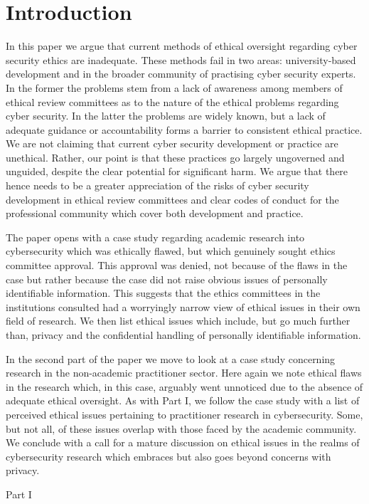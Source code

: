 \documentclass{svjour3}                     %
\begin{document}
\section{Introduction}
\label{intro}
In this paper we argue that current methods of ethical oversight regarding cyber security ethics are inadequate. These methods fail in two areas: university-based development and in the broader community of practising cyber security experts. In the former the problems stem from a lack of awareness among members of ethical review committees as to the nature of the ethical problems regarding cyber security. In the latter the problems are widely known, but a lack of adequate guidance or accountability forms a barrier to consistent ethical practice. We are not claiming that current cyber security development or practice are unethical. Rather, our point is that these practices go largely ungoverned and unguided, despite the clear potential for significant harm. We argue that there hence needs to be a greater appreciation of the risks of cyber security development in ethical review committees and clear codes of conduct for the professional community which cover both development and practice.

The paper opens with a case study regarding academic research into cybersecurity which was ethically flawed, but which genuinely sought ethics committee approval. This approval was denied, not because of the flaws in the case but rather because the case did not raise obvious issues of personally identifiable information. This suggests that the ethics committees in the institutions consulted had a worryingly narrow view of ethical issues in their own field of research. We then list ethical issues which include, but go much further than, privacy and the confidential handling of personally identifiable information.

In the second part of the paper we move to look at a case study concerning research in the non-academic practitioner sector. Here again we note ethical flaws in the research which, in this case, arguably went unnoticed due to the absence of adequate ethical oversight. As with Part I, we follow the case study with a list of perceived ethical issues pertaining to practitioner research in cybersecurity. Some, but not all, of these issues overlap with those faced by the academic community. We conclude with a call for a mature discussion on ethical issues in the realms of cybersecurity research which embraces but also goes beyond concerns with privacy.

Part I
\end{document}

